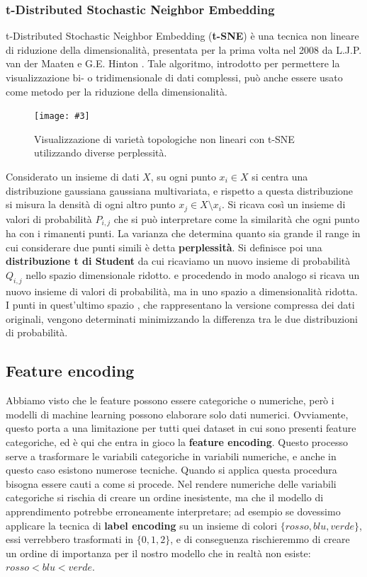 \documentclass[12pt, twoside, letterpaper]{report}
\newcommand{\img}[4] {
	\begin{figure}
		\centering
		\texttt{[image: \#3]}\\
		\caption{#1}
		\label{fig:#4}
	\end{figure}
}
\begin{document}
				\subsubsection{t-Distributed Stochastic Neighbor Embedding} t-Distributed Stochastic Neighbor Embedding (\textbf{t-SNE}) è una tecnica non lineare di riduzione della dimensionalità, presentata per la prima volta nel 2008 da  L.J.P. van der Maaten e G.E. Hinton \cite{maaten_hinton}. Tale algoritmo, introdotto per permettere la visualizzazione bi- o tridimensionale di dati complessi, può anche essere usato come metodo per la riduzione della dimensionalità.
				
					\img{Visualizzazione di varietà topologiche non lineari con t-SNE utilizzando diverse perplessità. \cite{sklearn}}{0.35}{tsne.png}{tsne}
				
					Considerato un insieme di dati $X$, su ogni punto $x_i \in X$ si centra una distribuzione gaussiana gaussiana multivariata, e rispetto a questa distribuzione si misura la densità di ogni altro punto $x_j \in X \setminus x_i$. Si ricava così un insieme di valori di probabilità $P_{i,j}$ che si può interpretare come la similarità che ogni punto ha con i rimanenti punti. La varianza che determina quanto sia grande il range in cui considerare due punti simili è detta \textbf{perplessità}. Si definisce poi una \textbf{distribuzione t di Student} da cui ricaviamo un nuovo insieme di probabilità $Q_{i,j}$ nello spazio dimensionale ridotto. e procedendo in modo analogo si ricava un nuovo insieme di valori di probabilità, ma in uno spazio a dimensionalità ridotta. I punti in quest'ultimo spazio , che rappresentano la versione compressa dei dati originali, vengono determinati minimizzando la differenza tra le due distribuzioni di probabilità.
					
			\subsection{Feature encoding} 
				Abbiamo visto che le feature possono essere categoriche o numeriche, però i modelli di machine learning possono elaborare solo dati numerici. Ovviamente, questo porta a una limitazione per tutti quei dataset in cui sono presenti feature categoriche, ed è qui che entra in gioco la \textbf{feature encoding}. Questo processo serve a trasformare le variabili categoriche in variabili numeriche, e anche in questo caso esistono numerose tecniche. Quando si applica questa procedura bisogna essere cauti a come si procede. Nel rendere numeriche delle variabili categoriche si rischia di creare un ordine inesistente, ma che il modello di apprendimento potrebbe erroneamente interpretare; ad esempio se dovessimo applicare la tecnica di \textbf{label encoding} su un insieme di colori $\{rosso, blu, verde\}$, essi verrebbero trasformati in $\{0,1,2\}$, e di conseguenza rischieremmo di creare un ordine di importanza per il nostro modello che in realtà non esiste: $rosso < blu < verde$.
				
\end{document}
